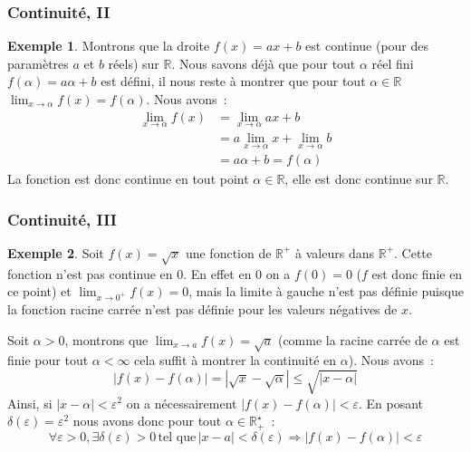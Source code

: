 \documentclass[10pt,notheorems]{beamer}
\theoremstyle{plain}
\theoremstyle{definition} %
\newtheorem{example}{Exemple}
\begin{document}
\begin{frame}
  \frametitle{Continuité, II}

  \begin{example}
    Montrons que la droite $f(x) = ax+b$ est continue (pour des paramètres $a$ et $b$ réels) sur $\mathbb R$. Nous savons déjà que pour tout $\alpha$ réel fini $f(\alpha) = a\alpha+b$ est défini, il nous reste à montrer que pour tout $\alpha\in\mathbb R$ $\lim_{x\rightarrow\alpha}f(x)=f(\alpha)$. Nous avons~:
    \[
      \begin{split}
        \lim_{x\rightarrow\alpha}f(x) &= \lim_{x\rightarrow\alpha} ax+b\\
        &= a\lim_{x\rightarrow\alpha} x + \lim_{x\rightarrow\alpha} b\\
        &= a\alpha + b = f(\alpha)
      \end{split}
    \]
    La fonction est donc continue en tout point $\alpha\in\mathbb R$, elle est donc continue sur $\mathbb R$.
  \end{example}

\end{frame}


\begin{frame}
  \frametitle{Continuité, III}

  \begin{example}

    Soit $f(x) = \sqrt{x}$ une fonction de  $\mathbb R^+$ à valeurs dans $\mathbb R^+$. Cette fonction n'est pas continue en 0. En effet en 0 on a $f(0) = 0$ ($f$ est donc finie en ce point) et $\lim_{x\rightarrow 0^+}f(x) = 0$, mais la limite à gauche n'est pas définie puisque la fonction racine carrée n'est pas définie pour les valeurs négatives de $x$.\newline

    Soit $\alpha>0$, montrons que $\lim_{x\rightarrow a}f(x) = \sqrt{a}$ (comme la racine carrée de $\alpha$ est finie pour tout $\alpha<\infty$ cela suffit à montrer la continuité en $\alpha$). Nous avons~:
    \[
      |f(x)-f(\alpha)| = |\sqrt{x}-\sqrt{\alpha}| \leq \sqrt{|x-\alpha|}
    \]
    Ainsi, si $|x-\alpha|<\varepsilon^2$ on a nécessairement $|f(x)-f(\alpha)|<\varepsilon$. En posant $\delta(\varepsilon) = \varepsilon^2$ nous avons donc pour tout $\alpha\in\mathbb R_+^{\star}$~:
    \[
      \forall \varepsilon>0, \exists \delta(\varepsilon)>0\,\text{tel que}\, |x-a|<\delta(\varepsilon)\Rightarrow |f(x)-f(\alpha)|<\varepsilon
    \]
  \end{example}

\end{frame}
\end{document}
